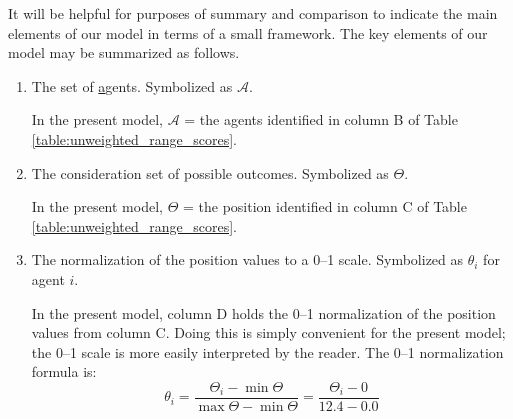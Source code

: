 %


It will be helpful for purposes of summary and comparison to indicate the main elements of our model in terms of a small framework.
The key elements of our model may be summarized as follows.
\begin{enumerate}
  \renewcommand{\theenumi}{\roman{enumi}}

\item The set of \underline{a}gents. Symbolized as $\mathcal{A}$.

 
 In the present model, $\mathcal{A}$ = the agents identified in column B of Table \ref{table:unweighted_range_scores}. %
%
\item The consideration set of possible outcomes. Symbolized as $\Theta$.




In the present model, $\Theta$ = the   {position} identified in column C of Table \ref{table:unweighted_range_scores}. %

\item The normalization of the   {position} values to a 0--1 scale. Symbolized as $\theta_i$ for agent $i$.

In the present model, column D holds the 0--1 normalization of the   {position} values from column C.  Doing this is simply convenient for the present model; the 0--1 scale is more easily interpreted by the reader. The 0--1 normalization formula is:
\begin{equation}
\theta_i = \frac{\Theta_i - \min\Theta}{\max{\Theta}-\min{\Theta}} = \frac{\Theta_i - 0}{12.4 - 0.0} 
\end{equation}


\end{enumerate}
